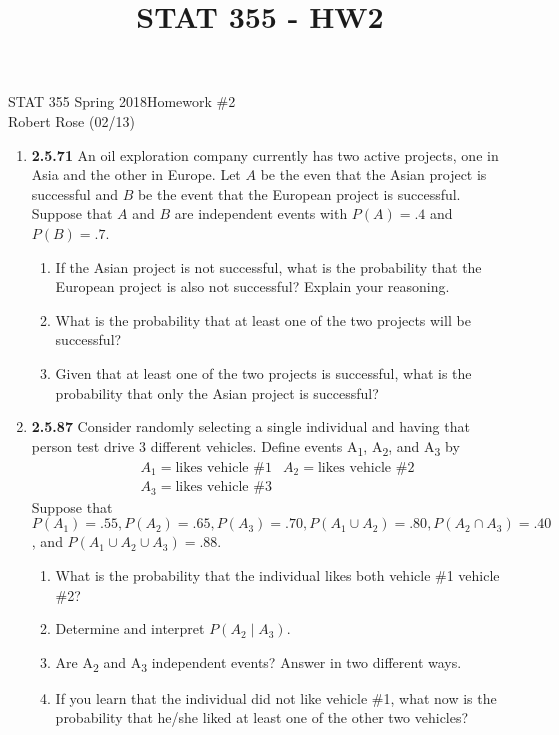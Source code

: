 \documentclass[12pt]{article}
\title{STAT 355 - HW2}
\begin{document}
STAT 355 Spring 2018\hfill Homework \#2\\
Robert Rose (02/13)

\hrulefill

\begin{enumerate}
\item \textbf{2.5.71} An oil exploration company currently has two active projects, one in Asia and the other in Europe. Let $A$ be the even that the Asian project is successful and $B$ be the event that the European project is successful. Suppose that $A$ and $B$ are independent events with $P(A) = .4$ and $P(B) = .7$.
  \begin{enumerate}
  \item If the Asian project is not successful, what is the probability that the European project is also not successful? Explain your reasoning.
  \item What is the probability that at least one of the two projects will be successful?
  \item Given that at least one of the two projects is successful, what is the probability that only the Asian project is successful?
  \end{enumerate}
\newpage

\item \textbf{2.5.87} Consider randomly selecting a single individual and having that person test drive 3 different vehicles. Define events A\textsubscript{1}, A\textsubscript{2}, and A\textsubscript{3} by
\begin{align*}
&A_1 = \text{likes vehicle \#1} & A_2 = \text{likes vehicle \#2}\\
&A_3 = \text{likes vehicle \#3} &
\end{align*}
Suppose that $P(A_1) = .55, P(A_2) = .65, P(A_3) = .70, P(A_1 \cup A_2) = .80, P(A_2 \cap A_3) = .40$, and $P(A_1 \cup A_2 \cup A_3) = .88.$
  \begin{enumerate}
  \item What is the probability that the individual likes both vehicle \#1 vehicle \#2?
  \item Determine and interpret $P(A_2 \mid A_3)$.
  \item Are A\textsubscript{2} and A\textsubscript{3} independent events? Answer in two different ways.
  \item If you learn that the individual did not like vehicle \#1, what now is the probability that he/she liked at least one of the other two vehicles?
  \end{enumerate}


\end{enumerate}
\end{document}
